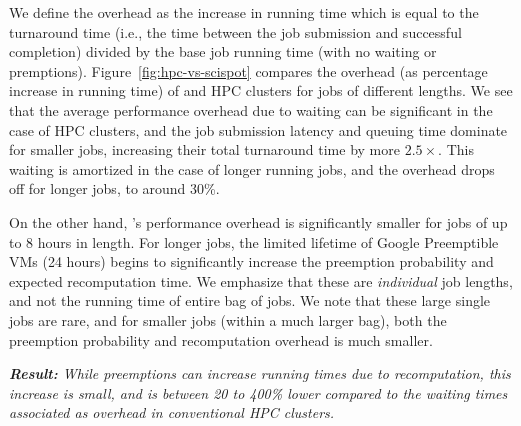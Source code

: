 We define the overhead as the increase in running time which is equal to the turnaround time (i.e., the time between the job submission and successful completion) divided by the base job running time (with no waiting or premptions). 
Figure~\ref{fig:hpc-vs-scispot} compares the overhead (as percentage increase in running time) of \sysname and HPC clusters  for jobs of different lengths. We see that the average performance overhead due to waiting can be significant in the case of HPC clusters, and the job submission latency and queuing time dominate for smaller jobs, increasing their total turnaround time by more $2.5\times$.
This waiting is amortized in the case of longer running jobs, and the overhead drops off for longer jobs, to around 30\%.

On the other hand, \sysname's performance overhead is significantly smaller for jobs of up to 8 hours in length.
For longer jobs, the limited lifetime of Google Preemptible VMs (24 hours) begins to significantly increase the preemption probability and expected recomputation time.
We emphasize that these are \emph{individual} job lengths, and not the running time of entire bag of jobs.
We note that these large single jobs are rare, and for smaller jobs (within a much larger bag), both the preemption probability and recomputation overhead is much smaller.

\noindent \emph{ \textbf{Result:} While preemptions can increase running times due to recomputation, this increase is small, and is between 20 to 400\% lower compared to the waiting times associated as overhead in conventional HPC clusters. }

% 
% 


